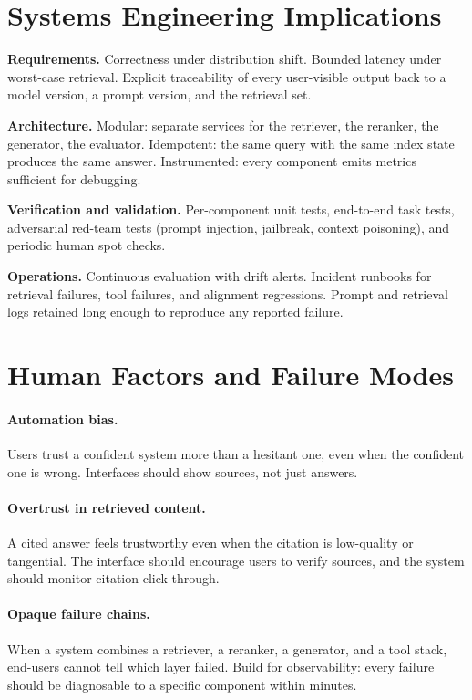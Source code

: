 \section{Systems Engineering Implications}

\textbf{Requirements.} Correctness under distribution shift.
Bounded latency under worst-case retrieval. Explicit traceability
of every user-visible output back to a model version, a prompt
version, and the retrieval set.

\textbf{Architecture.} Modular: separate services for the
retriever, the reranker, the generator, the evaluator.
Idempotent: the same query with the same index state produces
the same answer. Instrumented: every component emits metrics
sufficient for debugging.

\textbf{Verification and validation.} Per-component unit tests,
end-to-end task tests, adversarial red-team tests (prompt
injection, jailbreak, context poisoning), and periodic human
spot checks.

\textbf{Operations.} Continuous evaluation with drift alerts.
Incident runbooks for retrieval failures, tool failures, and
alignment regressions. Prompt and retrieval logs retained long
enough to reproduce any reported failure.

\section{Human Factors and Failure Modes}

\paragraph{Automation bias.} Users trust a confident system more
than a hesitant one, even when the confident one is wrong.
Interfaces should show sources, not just answers.

\paragraph{Overtrust in retrieved content.} A cited answer feels
trustworthy even when the citation is low-quality or tangential.
The interface should encourage users to verify sources, and the
system should monitor citation click-through.

\paragraph{Opaque failure chains.} When a system combines a
retriever, a reranker, a generator, and a tool stack, end-users
cannot tell which layer failed. Build for observability: every
failure should be diagnosable to a specific component within
minutes.

